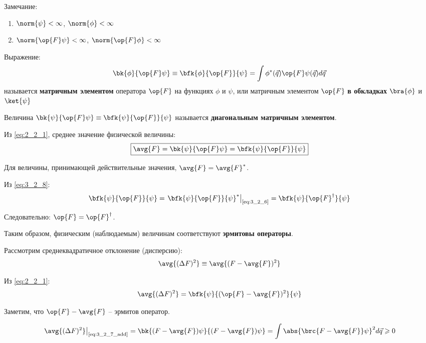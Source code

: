 Замечание:
\begin{enumerate}
\item $\norm{\psi} < \infty$, $\norm{\phi} < \infty$
\item $\norm{\op{F} \psi} < \infty$, $\norm{\op{F} \phi} < \infty$
\end{enumerate}

\begin{defn}
Выражение:
$$
\bk{\phi}{\op{F}\psi} \equiv \bfk{\phi}{\op{F}}{\psi} = \int \phi^*(\vec{q})\op{F}\psi(\vec{q}) d\vec{q}
$$
называется \textbf{матричным элементом} оператора $\op{F}$ на функциях $\phi$ и $\psi$, или матричным элементом $\op{F}$ \textbf{в обкладках} $\bra{\phi}$ и $\ket{\psi}$  

Величина $\bk{\psi}{\op{F}\psi} \equiv \bfk{\psi}{\op{F}}{\psi}$ называется \textbf{диагональным матричным элементом}.
\end{defn}

Из \eqref{eq:2_2_1}, среднее значение физической величины:
\begin{equation}
\label{eq:3_2_8}
\boxed {
	\avg{F} = \bk{\psi}{\op{F}\psi} = \bfk{\psi}{\op{F}}{\psi}
}
\end{equation}

Для величины, принимающей действительные значения, $\avg{F} = \avg{F}^*$.

Из \eqref{eq:3_2_8}:
\begin{equation}
\label{eq:3_2_9}
\bfk{\psi}{\op{F}}{\psi} = \left .\bfk{\psi}{\op{F}}{\psi}^* \right|_{\text{\eqref{eq:3_2_6}}} = \bfk{\psi}{\op{F}^\dag}{\psi}
\end{equation}

Следовательно: $\op{F} = \op{F}^\dag$.

Таким образом, физическим (наблюдаемым) величинам соответствуют \textbf{эрмитовы операторы}.

Рассмотрим среднеквадратичное отклонение (дисперсию):
\begin{equation}
\label{eq:3_2_10}
\avg{(\Delta F)^2} \equiv \avg{(F - \avg{F})^2}
\end{equation}

Из \eqref{eq:2_2_1}:
\begin{equation}
\label{eq:3_2_11}
\avg{(\Delta F)^2} = \bfk{\psi}{(\op{F} - \avg{F})^2}{\psi}
\end{equation}

Заметим, что $\op{F} - \avg{F}$ -- эрмитов оператор.

\begin{equation}
\label{eq:3_2_12}
\left. \avg{(\Delta F)^2} \right|_{\text{\eqref{eq:3_2_7_add}}} = \bk{(F - \avg{F})\psi}{(F - \avg{F})\psi} = \int \abs{\brc{F - \avg{F}}\psi}^2 d\vec{q} \geqslant 0
\end{equation}

